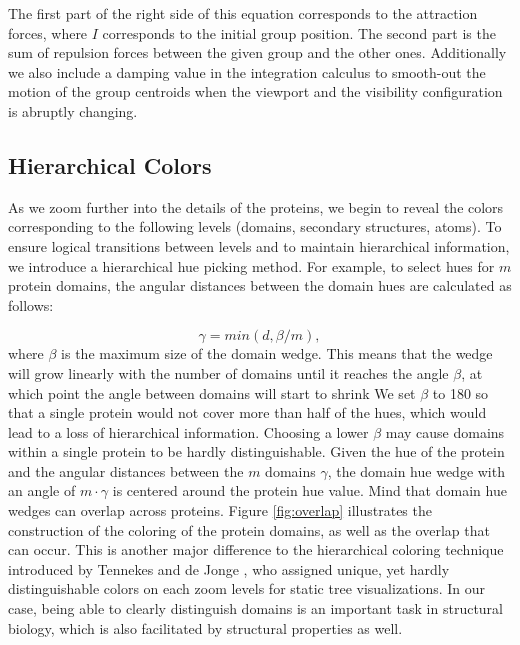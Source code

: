 \documentclass[review,journal]{vgtc}         %
\begin{document}
	The first part of the right side of this equation corresponds to the attraction forces, where $I$ corresponds to the initial group position.
	The second part is the sum of repulsion forces between the given group and the other ones.
	Additionally we also include a damping value in the integration calculus to smooth-out the motion of the group centroids when the viewport and the visibility configuration is abruptly changing.
	
	\subsection{Hierarchical Colors}
	\label{sec:hierarchy}
	
	
	
	As we zoom further into the details of the proteins, we begin to reveal the colors corresponding to the following levels (domains, secondary structures, atoms). 
	To ensure logical transitions between levels and to maintain hierarchical information, we introduce a hierarchical hue picking method. 
	For example, to select hues for $m$ protein domains, the angular distances between the domain hues are calculated as follows: 
	
	\[
	\gamma = min(d, \beta / m),
	\]
	where $\beta$ is the maximum size of the domain wedge.
	This means that the wedge will grow linearly with the number of domains until it reaches the angle $\beta$, at which point the angle between domains will start to shrink
	We set $\beta$ to 180 so that a single protein would not cover more than half of the hues, which would lead to a loss of hierarchical information. 
	Choosing a lower $\beta$ may cause domains within a single protein to be hardly distinguishable.  
	Given the hue of the protein and the angular distances between the $m$ domains $\gamma$, the domain hue wedge with an angle of $m \cdot \gamma$ is centered around the protein hue value.
	Mind that domain hue wedges can overlap across proteins. 
	Figure \ref{fig:overlap} illustrates the construction of the coloring of the protein domains, as well as the overlap that can occur.
	This is another major difference to the hierarchical coloring technique introduced by Tennekes and de Jonge \cite{tennekes2014tree}, who assigned unique, yet hardly distinguishable colors on each zoom levels for static tree visualizations. 
	In our case, being able to clearly distinguish domains is an important task in structural biology, which is also facilitated by structural properties as well. 
	
\end{document}
